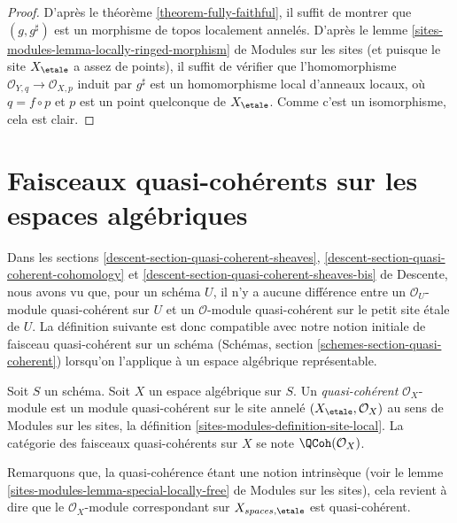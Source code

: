 \begin{proof}
D'après le
théorème \ref{theorem-fully-faithful},
il suffit de montrer que $(g, g^\sharp)$ est un morphisme de
topos localement annelés. D'après le
lemme \ref{sites-modules-lemma-locally-ringed-morphism} de Modules sur les sites
(et puisque le site $X_\etale$ a assez de points),
il suffit de vérifier que l'homomorphisme
$\mathcal{O}_{Y, q} \to \mathcal{O}_{X, p}$ induit par $g^\sharp$
est un homomorphisme local d'anneaux locaux, où $q = f \circ p$ et $p$ est un point quelconque de
$X_\etale$. Comme c'est un isomorphisme, cela est clair.
\end{proof}














\section{Faisceaux quasi-cohérents sur les espaces algébriques}
\label{section-quasi-coherent}

\noindent
Dans les
sections \ref{descent-section-quasi-coherent-sheaves},
\ref{descent-section-quasi-coherent-cohomology} et
\ref{descent-section-quasi-coherent-sheaves-bis}
de Descente, nous avons vu que, pour un schéma $U$, il n'y a aucune différence entre un
$\mathcal{O}_U$-module quasi-cohérent sur $U$ et un
$\mathcal{O}$-module quasi-cohérent sur le petit site \'etale de $U$. La définition
suivante est donc compatible avec notre notion initiale de faisceau quasi-cohérent
sur un schéma
(Schémas, section \ref{schemes-section-quasi-coherent})
lorsqu'on l'applique à un espace algébrique représentable.

\begin{definition}
\label{definition-quasi-coherent}
Soit $S$ un schéma. Soit $X$ un espace algébrique sur $S$.
Un {\it quasi-cohérent} $\mathcal{O}_X$-module
est un module quasi-cohérent sur le site annelé
$(X_\etale, \mathcal{O}_X)$ au sens de
Modules sur les sites,
la définition \ref{sites-modules-definition-site-local}.
La catégorie des faisceaux quasi-cohérents sur $X$ se note
$\QCoh(\mathcal{O}_X)$.
\end{definition}

\noindent
Remarquons que, la quasi-cohérence étant une notion intrinsèque (voir le
lemme \ref{sites-modules-lemma-special-locally-free} de Modules sur les sites),
cela revient à dire que le $\mathcal{O}_X$-module correspondant
sur $X_{spaces, \etale}$ est quasi-cohérent.

